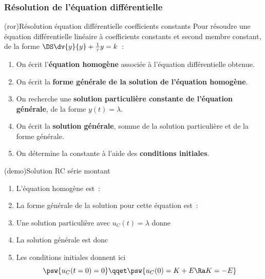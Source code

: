 \documentclass[../../main/main.tex]{subfiles}
\begin{document}
\subsubsection{Résolution de l'équation différentielle}
\begin{tcb}[label=impo:eqres](ror){Résolution équation différentielle
			coefficients constants}
	Pour résoudre une équation différentielle linéaire à
	coefficients constants et second membre constant, de la forme
	$\DS \dv{y}{y} + \frac{1}{\tau}y = k$~:
	\begin{enumerate}[label=\sqenumi]
		\item On écrit l'\textbf{équation homogène} associée à
		      l'équation différentielle obtenue.
		\item On écrit la \textbf{forme générale de la solution de
			      l'équation homogène}.
		\item On recherche une \textbf{solution particulière
			      constante de l'équation générale}, de la forme $y(t) =
			      \lambda$.
		\item On écrit la \textbf{solution générale}, somme de la
		      solution particulière et de la forme générale.
		\item On détermine la constante à l'aide des
		      \textbf{conditions initiales}.
	\end{enumerate}
\end{tcb}
\begin{tcb}[label=demo:rcsolu](demo){Solution RC série montant}
	\begin{enumerate}[label=\sqenumi]
		\item L'équation homogène est~:
		      \psw{
			      \[
				      \dv{u_C}{t} + \frac{1}{\tau}u_C = 0
			      \]
		      }
		      \vspace{-15pt}
		\item La forme générale de la solution pour cette équation est~:
		      \psw{
			      \[
				      u_C(t) = K\exp\left( -\frac{t}{\tau} \right)
			      \]
		      }
		      \vspace{-15pt}
		\item Une solution particulière avec $u_C(t) = \lambda$ donne
		\item La solution générale est donc
		      \psw{
			      \[
				      u_C(t) = E + K\exp \left( - \frac{t}{\tau} \right)
			      \]
		      }
		      \vspace{-15pt}
		\item Les conditions initiales donnent ici
		      \[
			      \psw{u_C(t=0) = 0}
			      \qqet
			      \psw{u_C(0) = K + E \Ra K=-E}
		      \]
	\end{enumerate}
\end{tcb}
\end{document}
